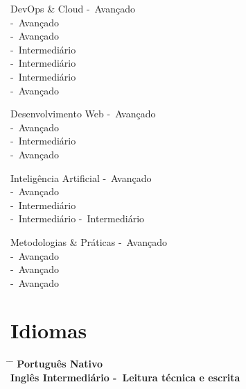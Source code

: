 \documentclass{article}
\begin{document}
\begin{skillgroup}{DevOps \& Cloud}%
	 -\ Avançado \\
	 -\ Avançado \\
	 -\ Avançado \\
	 -\ Intermediário \\
	 -\ Intermediário \\
	 -\ Intermediário \\
	 -\ Avançado
\end{skillgroup}

\begin{skillgroup}{Desenvolvimento Web}%
	 -\ Avançado \\
	 -\ Avançado \\
	 -\ Intermediário \\
	 -\ Avançado
\end{skillgroup}

\begin{skillgroup}{Inteligência Artificial}%
	 -\ Avançado \\
	 -\ Avançado \\
	 -\ Intermediário \\
	 -\ Intermediário
	 -\ Intermediário \\
\end{skillgroup}

\begin{skillgroup}{Metodologias \& Práticas}%
	 -\ Avançado \\
	 -\ Avançado \\
	 -\ Avançado \\
	 -\ Avançado \\
\end{skillgroup}

\section*{Idiomas}

\begin{tabbing}
	\hspace{2cm} \= \hspace{4cm} \= \kill
	\bf{Português} \> Nativo \\
	\bf{Inglês} \> Intermediário -\ Leitura técnica e escrita
\end{tabbing}
\end{document}
